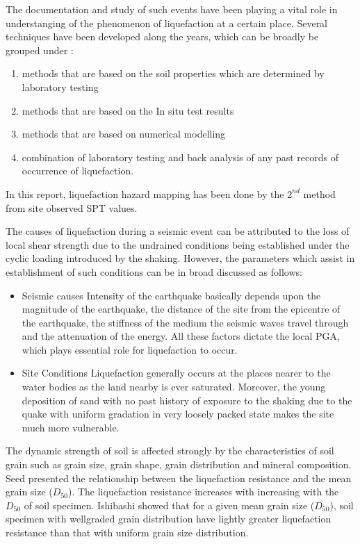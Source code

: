 The documentation and study of such events have been playing a vital role in understanging of the phenomenon of liquefaction at a certain place. Several techniques have been developed along the years, which can be broadly be grouped under :
\begin{enumerate}
\item methods that are based on the soil properties which are determined by laboratory testing
\item methods that are based on the In\- situ test results
\item methods that are based on numerical modelling
\item combination of laboratory testing and back analysis of any past records of occurrence of liquefaction.
\end{enumerate}

In this report, liquefaction hazard mapping has been done by the $2^{nd}$ method from site observed SPT values.

The causes of liquefaction during a seismic event can be attributed to the loss of local shear strength due to the undrained conditions being established under the cyclic loading introduced by the shaking. However, the parameters which assist in establishment of such conditions can be in broad discussed as follows:

\begin{itemize}
\item Seismic causes
Intensity of the earthquake basically depends upon the magnitude of the earthquake, the distance of the site from the epicentre of the earthquake, the stiffness of the medium the seismic waves travel through and the attenuation of the energy. All these factors dictate the local PGA, which plays essential role for liquefaction to occur.
\item Site Conditions
Liquefaction generally occurs at the places nearer to the water bodies as the land nearby is ever saturated. Moreover, the young deposition of sand with no past history of exposure to the shaking due to the quake with uniform gradation in very loosely packed state makes the site much more vulnerable.
\end{itemize}

The dynamic strength of soil is affected strongly by the characteristics of soil grain such as grain size, grain shape, grain distribution and mineral composition. Seed presented the relationship between the liquefaction resistance and the mean grain size ($D_{50}$).\cite{r12} The liquefaction resistance increases with increasing with the $D_{50}$ of soil specimen. Ishibashi  showed that for a given mean grain size ($D_{50}$), soil specimen with well\-graded grain distribution have lightly greater liquefaction resistance than that with uniform grain size distribution.\cite{r14}

